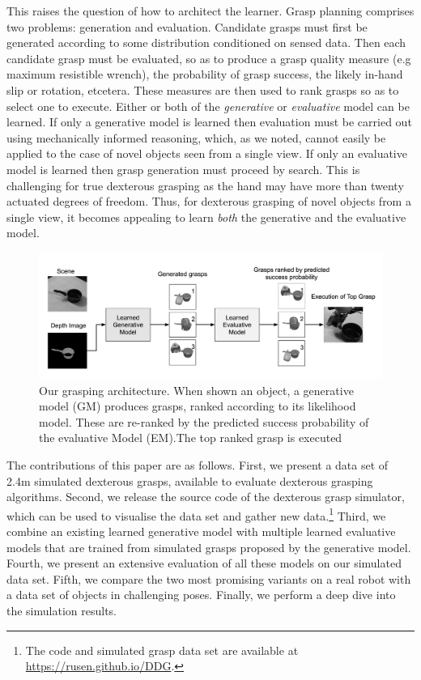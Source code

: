 This raises the question of how to architect the learner. Grasp planning comprises two problems: generation and evaluation. Candidate grasps must first be generated according to some distribution conditioned on sensed data. Then each candidate grasp must be evaluated, so as to produce a grasp quality measure (e.g maximum resistible wrench), the probability of grasp success, the likely in-hand slip or rotation, etcetera. These measures are then used to rank grasps so as to select one to execute. Either or both of the {\em generative} or {\em evaluative} model can be learned. If only a generative model is learned then evaluation must be carried out using mechanically informed reasoning, which, as we noted, cannot easily be applied to the case of novel objects seen from a single view. If only an evaluative model is learned then grasp generation must proceed by search. This is challenging for true dexterous grasping as the hand may have more than twenty actuated degrees of freedom. Thus, for dexterous grasping of novel objects from a single view, it becomes appealing to learn {\em both} the generative and the evaluative model. 
\begin{figure}[t]
\begin{center}
  \includegraphics[width=\columnwidth]{images/GEAarchitecture.png}
  \end{center}
  \caption{Our grasping architecture. When shown an object, a generative model (GM) produces grasps, ranked according to its likelihood model. These are re-ranked by the predicted success probability of the evaluative Model (EM).The top ranked grasp is executed \label{fig:systemArchitecture}}
\end{figure}

The contributions of this paper are as follows. First, we present a data set of 2.4m simulated dexterous grasps, available to evaluate dexterous grasping algorithms. Second, we release the source code of the dexterous grasp simulator, which can be used to visualise the data set and gather new data.\footnote{The code and simulated grasp data set are available at \href{https://rusen.github.io/DDG}{https://rusen.github.io/DDG}.} Third, we combine an existing learned generative model with multiple learned evaluative models that are trained from simulated grasps proposed by the generative model. Fourth, we present an extensive evaluation of all these models on our simulated data set. Fifth, we compare the two most promising variants on a real robot with a data set of objects in challenging poses. Finally, we perform a deep dive into the simulation results.

